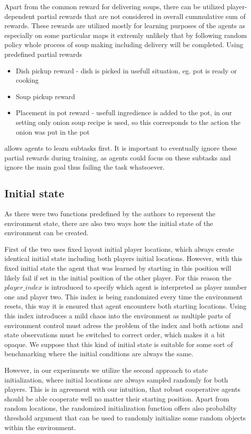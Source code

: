 Apart from the common reward for delivering soups, there can be utilized player-dependent partial rewards that are not considered in overall cummulative sum of rewards.
These rewards are utilized mostly for learning purposes of the agents as especially on some particular maps it extremly unlikely that by following random policy whole process of soup making including delivery will be completed.
Using predefined partial rewards
\begin{itemize}
    \item Dish pickup reward - dish is picked in usefull situation, eg. pot is ready or cooking
    \item Soup pickup reward 
    \item Placement in pot reward - usefull ingredience is added to the pot, in our setting only onion soup recipe is used, so this corresponds to the action the onion was put in the pot
\end{itemize}
allows agents to learn subtasks first.
It is important to eventually ignore these partial rewards during training, as agents could focus on these subtasks and ignore the main goal thus failing the task whatsoever.


\subsection{Initial state}
As there were two functions predefined by the authors to represent the environment state, there are also two ways how the initial state of the environment can be created.

First of the two uses fixed layout initial player locations, which always create identical initial state including both players initial locations.
However, with this fixed initial state the agent that was learned by starting in this position will likely fail if set in the initial position of the other player.
For this reason the $player\_index$ is introduced to specify which agent is interpreted as player number one and player two.
This index is being randomized every time the environment resets, this way it is ensured that agent encounters both starting locations.
Using this index introduces a mild chaos into the environment as multiple parts of environment control must adress the problem of the index and both actions and state observations must be switched to correct order, which makes it a bit opaque.
We suppose that this kind of initial state is suitable for some sort of benchmarking where the initial conditions are always the same.

However, in our experiments we utilize the second approach to state initialization, where initial locations are always sampled randomly for both players.
This is in agreement with our intuition, that robust cooperative agents should be able cooperate well no matter their starting position.
Apart from random locations, the randomized initialization function offers also probabilty threshold argument that can be used to randomly initialize some random objects within the environment.
